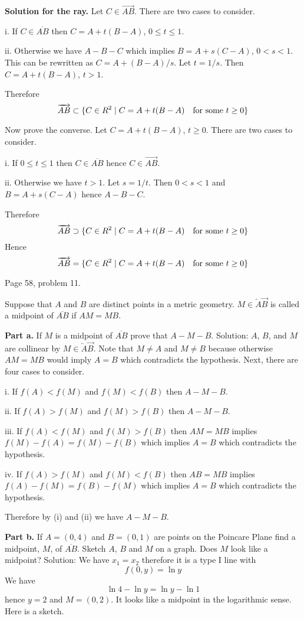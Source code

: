\medskip\noindent
{\bf Solution for the ray.} Let $C\in\overrightarrow{AB}$.
There are two cases to consider.
\item{i.} If $C\in\overline{AB}$ then $C=A+t(B-A)$, $0\le t\le 1$.
\item{ii.} Otherwise we have $A{-}B{-}C$ which implies $B=A+s(C-A)$,
$0<s<1$.
This can be rewritten as $C=A+(B-A)/s$.
Let $t=1/s$. Then $C=A+t(B-A)$, $t>1$.
\par
\noindent
Therefore
$$\overrightarrow{AB}\subset\{C\in R^2\mid C=A+t(B-A)\quad\hbox{for some $t\ge 0$}\}$$
\par
\noindent
Now prove the converse.
Let $C=A+t(B-A)$, $t\ge0$.
There are two cases to consider.
\item{i.} If $0\le t\le 1$ then $C\in\overline{AB}$ hence $C\in\overrightarrow{AB}$.
\item{ii.} Otherwise we have $t>1$. Let $s=1/t$.
Then $0<s<1$ and $B=A+s(C-A)$ hence $A{-}B{-}C$.
\par\noindent
Therefore
$$\overrightarrow{AB}\supset\{C\in R^2\mid C=A+t(B-A)\quad\hbox{for some $t\ge 0$}\}$$
Hence
$$\overrightarrow{AB}=\{C\in R^2\mid C=A+t(B-A)\quad\hbox{for some $t\ge 0$}\}$$

\beginsection Page 58, problem 11.

Suppose that $A$ and $B$ are distinct points in a metric geometry.
$M\in\overleftarrow A\overrightarrow B$ is called a midpoint of
$\overline{AB}$ if $AM=MB$.

\medskip\noindent
{\bf Part a.} If $M$ is a midpoint of $\overline{AB}$ prove that $A{-}M{-}B$.
\medskip\noindent
Solution: $A$, $B$, and $M$ are collinear by $M\in\overleftarrow A\overrightarrow B$.
Note that $M\ne A$ and $M\ne B$ because otherwise $AM=MB$ would imply
$A=B$ which contradicts the hypothesis.
Next, there are four cases to consider.
\item{i.} If $f(A)<f(M)$ and $f(M)<f(B)$ then $A{-}M{-}B$.
\item{ii.} If $f(A)>f(M)$ and $f(M)>f(B)$ then $A{-}M{-}B$.
\item{iii.} If $f(A)<f(M)$ and $f(M)>f(B)$ then $AM=MB$ implies
$f(M)-f(A)=f(M)-f(B)$ which implies $A=B$ which contradicts the hypothesis.
\item{iv.} If $f(A)>f(M)$ and $f(M)<f(B)$ then $AB=MB$ implies
$f(A)-f(M)=f(B)-f(M)$ which implies $A=B$ which contradicts the hypothesis.
\par\noindent
Therefore by (i) and (ii) we have $A{-}M{-}B$.

\medskip\noindent
{\bf Part b.}
If $A=(0,4)$ and $B=(0,1)$ are points on the Poincare Plane find a midpoint,
$M$, of $\overline{AB}$. Sketch $A$, $B$ and $M$ on a graph.
Does $M$ look like a midpoint?
\medskip\noindent
Solution: We have $x_1=x_2$ therefore it is a type I line with
$$f(0,y)=\ln y$$
We have
$$\ln 4-\ln y=\ln y-\ln 1$$
hence $y=2$ and $M=(0,2)$. It looks like a midpoint in the logarithmic sense.
\medskip\noindent
Here is a sketch.

